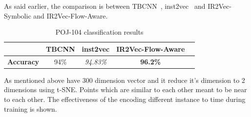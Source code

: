 As said earlier, the comparison is between TBCNN~\cite{tbcnn-aaai16}, inst2vec~\cite{ncc} and IR2Vec-Symbolic and IR2Vec-Flow-Aware.

\begin{table}[h]
\centering
  \caption{POJ-104 classification results}
  \label{tab:pc_accuracy}   %
    \begin{tabular}{ccccc}
    \toprule
     & \textbf{TBCNN} & \textbf{inst2vec} & \textbf{IR2Vec-Flow-Aware}\\
        \hline
        \textbf{Accuracy} & 94\% & \textit{94.83\%\protect\footnotemark}  & \textbf{96.2\%} \\
    \bottomrule
    \end{tabular}
\end{table}


As mentioned above have 300 dimension vector and it reduce it's dimension to 2 dimensions using t-SNE\cite{}. Points which are similar to each other meant to be near to each other. The effectiveness of the encoding different instance to time during training is shown.

